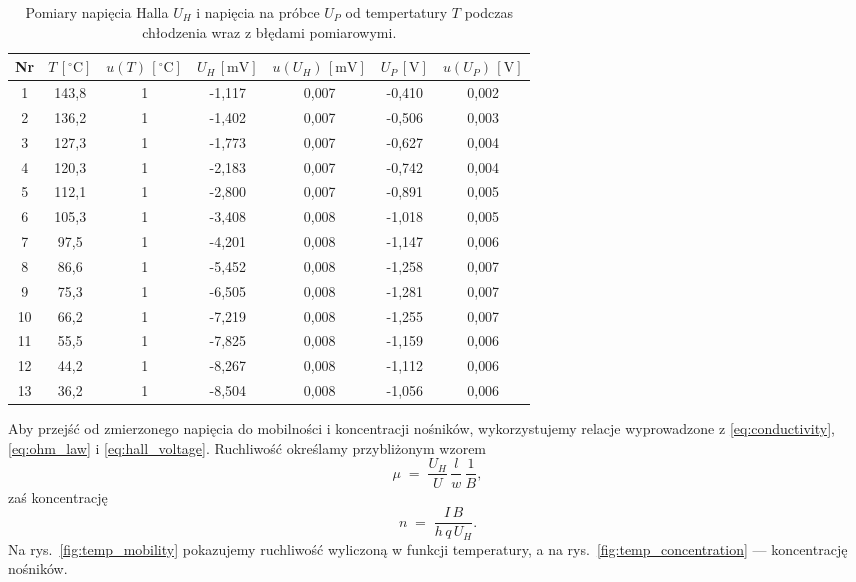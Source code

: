 \documentclass[12pt]{article}
\begin{document}
\begin{table}[H]
    \centering
    \begin{tabular}{c|cc|cc|cc}
        \toprule
        Nr & $T\,[^\circ \mathrm{C}]$ & $u(T)\,[^\circ \mathrm{C}]$ & $U_H\,[\mathrm{mV}]$ & $u(U_H)\,[\mathrm{mV}]$ & $U_P\,[\mathrm{V}]$ & $u(U_P)\,[\mathrm{V}]$ \\
        \midrule
        1  & 143{,}8 & 1 & -1{,}117 & 0{,}007 & -0{,}410 & 0{,}002 \\
        2  & 136{,}2 & 1 & -1{,}402 & 0{,}007 & -0{,}506 & 0{,}003 \\
        3  & 127{,}3 & 1 & -1{,}773 & 0{,}007 & -0{,}627 & 0{,}004 \\
        4  & 120{,}3 & 1 & -2{,}183 & 0{,}007 & -0{,}742 & 0{,}004 \\
        5  & 112{,}1 & 1 & -2{,}800 & 0{,}007 & -0{,}891 & 0{,}005 \\
        6  & 105{,}3 & 1 & -3{,}408 & 0{,}008 & -1{,}018 & 0{,}005 \\
        7  & 97{,}5  & 1 & -4{,}201 & 0{,}008 & -1{,}147 & 0{,}006 \\
        8  & 86{,}6  & 1 & -5{,}452 & 0{,}008 & -1{,}258 & 0{,}007 \\
        9  & 75{,}3  & 1 & -6{,}505 & 0{,}008 & -1{,}281 & 0{,}007 \\
        10 & 66{,}2  & 1 & -7{,}219 & 0{,}008 & -1{,}255 & 0{,}007 \\
        11 & 55{,}5  & 1 & -7{,}825 & 0{,}008 & -1{,}159 & 0{,}006 \\
        12 & 44{,}2  & 1 & -8{,}267 & 0{,}008 & -1{,}112 & 0{,}006 \\
        13 & 36{,}2  & 1 & -8{,}504 & 0{,}008 & -1{,}056 & 0{,}006 \\
        \bottomrule
    \end{tabular}
    \caption{Pomiary napięcia Halla $U_H$ i napięcia na próbce $U_P$ od tempertatury $T$ podczas chłodzenia wraz z błędami pomiarowymi.}
    \label{tab:cooling_measurements}
\end{table}

\noindent
Aby przejść od zmierzonego napięcia do mobilności i koncentracji nośników, wykorzystujemy relacje wyprowadzone z \eqref{eq:conductivity}, \eqref{eq:ohm_law} i \eqref{eq:hall_voltage}. Ruchliwość określamy przybliżonym wzorem
\[
    \mu \;=\; \frac{U_H}{U}\,\frac{l}{w}\,\frac{1}{B},
\]
zaś koncentrację
\[
    n \;=\; \frac{I\,B}{h\,q\,U_H}.
\]
Na rys.~\ref{fig:temp_mobility} pokazujemy ruchliwość wyliczoną w funkcji temperatury, a na rys.~\ref{fig:temp_concentration} — koncentrację nośników.
\end{document}
